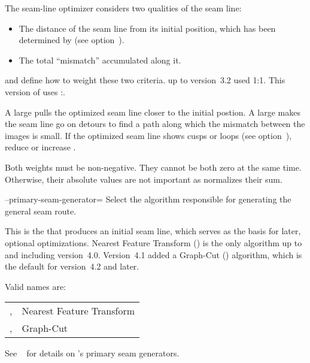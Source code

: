 \begin{codelist}
  The seam-line optimizer considers two qualities of the seam line:

  \begin{itemize}
  \item
    The distance of the seam line from its initial position, which has been determined by
     (see option~).

  \item
    The total ``mismatch'' accumulated along it.
  \end{itemize}

   and  define how to weight these two
  criteria.  \App{} up to version~3.2 used 1:1.  This version of \App{} uses
  :.

  A large  pulls the optimized seam line closer to the initial postion.
  A large  makes the seam line go on detours to find a path along
  which the mismatch between the images is small.  If the optimized seam line shows cusps or
  loops (see option~), reduce  or increase
  .

  Both weights must be non-negative.  They cannot be both zero at the same time.  Otherwise,
  their absolute values are not important as \App{} normalizes their sum.


  \label{opt:primary-seam-generator}%
\item[--primary-seam-generator=\metavar{ALGORITHM}]\itemend
  Select the algorithm responsible for generating the general seam route.

  This is the  that produces an initial seam line, which serves as the basis
  for later, optional optimizations.  Nearest Feature Transform () is the only
  algorithm up to and including \App{} version~4.0.  Version~4.1 added a Graph-Cut
  () algorithm, which is the default for version~4.2 and later.

  Valid  names are:

  \begin{center}
    \begin{tabular}{p{.45\linewidth}l}
      \code{nearest-feature-transform}, \code{nft}\genidx{nearest
        feature transform (\acronym{NFT})} & Nearest Feature Transform \\
    \code{graph-cut}, \code{gc}\genidx{graph-cut (\acronym{GC})} &
    Graph-Cut
    \end{tabular}
  \end{center}

  See \chapterName~ for details on \App's primary seam generators.
\end{codelist}



